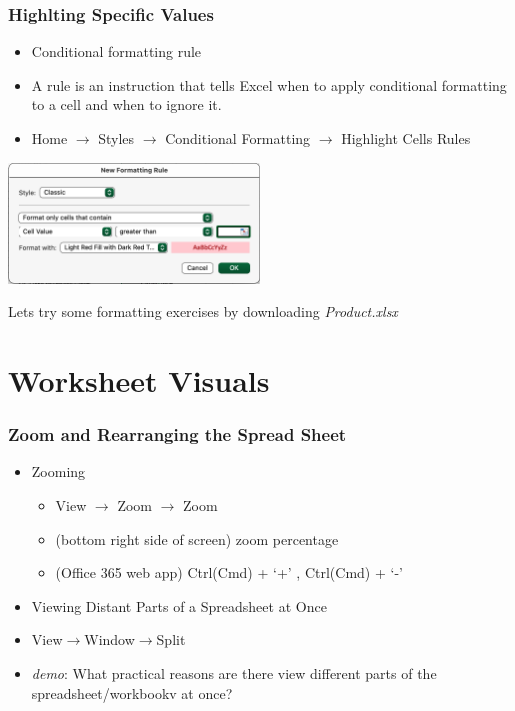 \documentclass[12pt]{beamer}
\begin{document}
	\begin{frame}
		\frametitle{Highlting Specific Values}
		\begin{itemize}
			\item Conditional formatting rule
		 	\item A rule is an instruction that tells Excel when to apply conditional formatting to a cell and when to ignore it.
		 	\item Home $\rightarrow$ Styles $\rightarrow$ Conditional Formatting $\rightarrow$ Highlight Cells Rules
		\end{itemize}
		\begin{center}
			\includegraphics[width=0.5\textwidth]{conditionalformatting.png}
		\end{center}
		Lets try some formatting exercises by downloading \textit{Product.xlsx}
	\end{frame}
\section{Worksheet Visuals}
	\begin{frame}
		\frametitle{Zoom and Rearranging the Spread Sheet}
		\begin{itemize}
		 \item Zooming
		 \begin{itemize}
		 	 \item View $\rightarrow$ Zoom $\rightarrow$ Zoom
		 	 \item (bottom right side of screen) zoom percentage
		 	 \item (Office 365 web app) Ctrl(Cmd) + `+' , Ctrl(Cmd) + `-'
		\end{itemize}
		\item Viewing Distant Parts of a Spreadsheet at Once
		\item View$\rightarrow$Window$\rightarrow$Split
		\item \textit{demo}: What practical reasons are there view different parts of the spreadsheet/workbookv at once?
		\end{itemize}
	\end{frame}
\end{document}
